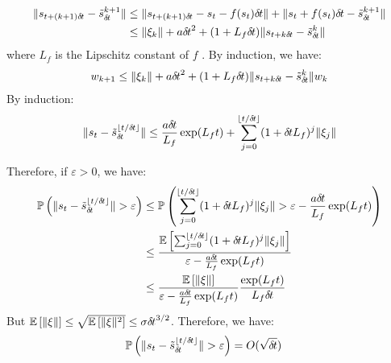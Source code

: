 \begin{align}
  \|s_{t+(k+1){\delta\hspace{-.1em}t}} - \tilde{s}_{\delta\hspace{-.1em}t}^{k+1}\| &\leq
                                                     \|s_{t+(k+1){\delta\hspace{-.1em}t}} - s_t - f(s_t){\delta\hspace{-.1em}t}\| + \|s_t + f(s_t){\delta\hspace{-.1em}t} - \tilde{s}_{\delta\hspace{-.1em}t}^{k+1}\|\\
  &\leq \|\xi_k\| + a{\delta\hspace{-.1em}t}^2 + (1+L_f{\delta\hspace{-.1em}t})\|s_{t+k{\delta\hspace{-.1em}t}} - \tilde{s}_{\delta\hspace{-.1em}t}^{k}\|
\end{align}
where $L_f$ is the Lipschitz constant of $f$ .
By induction, we have:
\begin{align}
  w_{k+1} \leq \|\xi_k\| + a{\delta\hspace{-.1em}t}^2 + (1+L_f{\delta\hspace{-.1em}t})\|s_{t+k{\delta\hspace{-.1em}t}} - \tilde{s}_{\delta\hspace{-.1em}t}^{k}\|w_k
\end{align}
By induction:
\begin{align}
  \|s_{t} - \tilde{s}_{\delta\hspace{-.1em}t}^{\lfloor t/{\delta\hspace{-.1em}t} \rfloor} \| \leq \frac{a{\delta\hspace{-.1em}t}}{L_f}\exp(L_ft) + \sum_{j=0}^{\lfloor t/{\delta\hspace{-.1em}t} \rfloor}(1+{\delta\hspace{-.1em}t} L_f)^j\|\xi_j\|  
\end{align}

Therefore, if $\varepsilon >0$, we have:
\begin{align}
  \mathbb{P}\left(\|s_{t} - \tilde{s}_{\delta\hspace{-.1em}t}^{\lfloor t/{\delta\hspace{-.1em}t} \rfloor} \| > \varepsilon \right) &\leq \mathbb{P}\left(\sum_{j=0}^{\lfloor t/{\delta\hspace{-.1em}t} \rfloor}(1+{\delta\hspace{-.1em}t} L_f)^j\|\xi_j\| > \varepsilon - \frac{a{\delta\hspace{-.1em}t}}{L_f}\exp(L_ft)\right) \\
                                                                                            &\leq \frac{\mathbb{E}\left[\sum_{j=0}^{\lfloor t/{\delta\hspace{-.1em}t} \rfloor}(1+{\delta\hspace{-.1em}t} L_f)^j\|\xi_j\|\right]}{\varepsilon - \frac{a{\delta\hspace{-.1em}t}}{L_f}\exp(L_ft)}\\
                                                                                            &\leq \frac{\mathbb{E}\left[\|\xi\|\right]}{\varepsilon - \frac{a{\delta\hspace{-.1em}t}}{L_f}\exp(L_ft)}\frac{\exp(L_ft)}{L_f{\delta\hspace{-.1em}t}}\\
\end{align}
But $\mathbb{E}\left[\|\xi\|\right] \leq \sqrt{\mathbb{E}\left[\|\xi\|^2\right]} \leq \sigma {\delta\hspace{-.1em}t}^{3/2}$. Therefore, we have:
\begin{align}
  \mathbb{P}\left(\|s_{t} - \tilde{s}_{\delta\hspace{-.1em}t}^{\lfloor t/{\delta\hspace{-.1em}t} \rfloor} \| > \varepsilon \right) & = O(\sqrt {{\delta\hspace{-.1em}t}})
\end{align}

